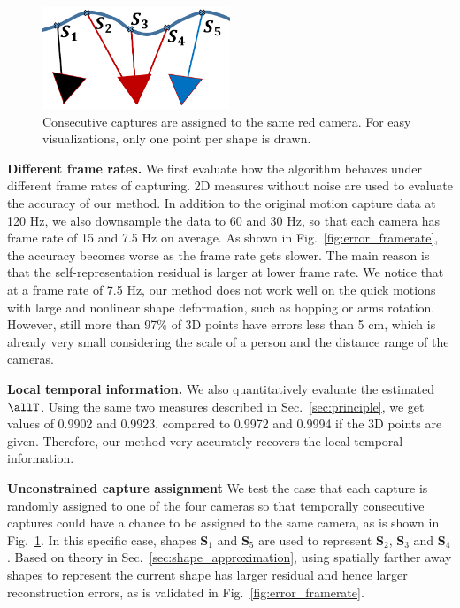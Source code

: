 \begin{figure}
\centering
\includegraphics[width=0.5\textwidth]{chapter5/resource/unconstrained_assignment_cropped.pdf}
\caption{Consecutive captures are assigned to the same red camera. For easy visualizations, only one point per shape is drawn.}
\label{fig:unconstrained_assign}
\end{figure}

\textbf{Different frame rates.}
We first evaluate how the algorithm behaves under different frame rates of capturing.
2D measures without noise are used to evaluate the accuracy of our method. In addition to the original motion capture data at 120 Hz, we also downsample the data to 60 and 30 Hz, so that each camera has frame rate of 15 and 7.5 Hz on average. As shown in Fig.~\ref{fig:error_framerate}, the accuracy becomes worse as the frame rate gets slower. 
The main reason is that the self-representation residual is larger at lower frame rate. We notice that at a frame rate of 7.5 Hz, our method does not work well on the quick motions with large and nonlinear shape deformation, such as hopping or arms rotation. However, still  more than 97\% of 3D points have errors less than 5 cm, which is already very small considering the scale of a person and the distance range of the cameras.

\textbf{Local temporal information.}
We also quantitatively evaluate the estimated $\allT$. Using the same two measures described in Sec.~\ref{sec:principle}, 
we get values of 0.9902 and 0.9923, compared to 0.9972 and 0.9994 if the 3D points are given. Therefore, our method very accurately recovers the local temporal information.

\textbf{Unconstrained capture assignment}
We test the case that each capture is randomly assigned to one of the four cameras so that temporally consecutive captures could have a chance to be assigned to the same camera, as is shown in Fig.~\ref{fig:unconstrained_assign}. In this specific case, shapes $\mathbf{S}_1$ and $\mathbf{S}_5$ are used to represent $\mathbf{S}_2$, $\mathbf{S}_3$ and $\mathbf{S}_4$. Based on theory in Sec.~\ref{sec:shape_approximation}, using spatially farther away shapes to represent the current shape has larger residual and hence larger reconstruction errors, as is validated in Fig.~\ref{fig:error_framerate}.
 
